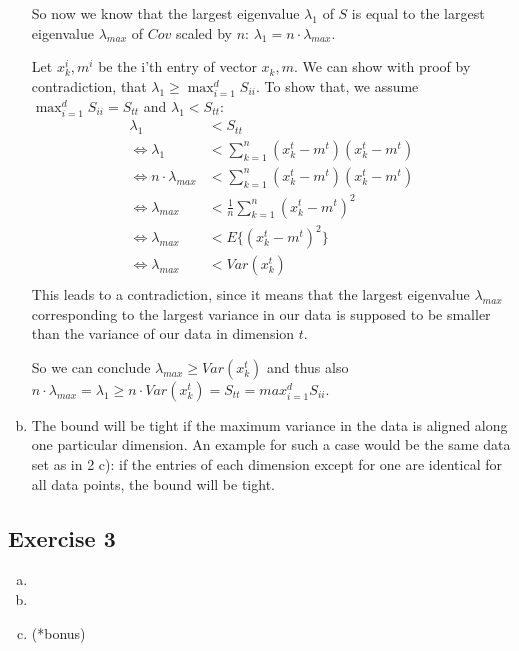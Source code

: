 \documentclass[10pt,a4paper]{article}
\begin{document}
\begin{enumerate}[(a)]
So now we know that the largest eigenvalue $\lambda_1$ of $S$ is equal to the largest eigenvalue $\lambda_{max}$ of $Cov$ scaled by $n$: $\lambda_1 = n\cdot \lambda_{max}$.

Let $x_k^i, m^i$ be the i'th entry of vector $x_k, m$. We can show with proof by contradiction, that $\lambda_1 \ge \max_{i=1}^d S_{ii}$. To show that, we assume $\max_{i=1}^d S_{ii} = S_{tt}$ and $\lambda_1 < S_{tt}$:
\begin{align*}
    \lambda_1 &< S_{tt}\\
    \Leftrightarrow \lambda_1 &< \sum_{k = 1}^{n}(x_k^t-m^t)(x_k^t-m^t)\\
    \Leftrightarrow n \cdot \lambda_{max} &< \sum_{k = 1}^{n}(x_k^t-m^t)(x_k^t-m^t)\\
    \Leftrightarrow \lambda_{max} &< \frac{1}{n}\sum_{k = 1}^{n}(x_k^t-m^t)^2\\
    \Leftrightarrow \lambda_{max} &< E\{(x_k^t-m^t)^2\}\\
    \Leftrightarrow \lambda_{max} &< Var(x_k^t)\\
\end{align*}
This leads to a contradiction, since it means that the largest eigenvalue $\lambda_{max}$ corresponding to the largest variance in our data is supposed to be smaller than the variance of our data in dimension $t$.

So we can conclude $ \lambda_{max} \ge Var(x_k^t)$ and thus also $ n\cdot\lambda_{max} = \lambda_1 \ge n\cdot Var(x_k^t) = S_{tt} = max_{i=1}^d S_{ii}$.
\item
The bound will be tight if the maximum variance in the data is aligned along one particular dimension. An example for such a case would be the same data set as in 2 c): if the entries of each dimension except for one are identical for all data points, the bound will be tight.
\end{enumerate}
\subsection*{Exercise 3}
\begin{enumerate}[(a)]
\item
\item
\item (*bonus)
\end{enumerate}
\end{document}
